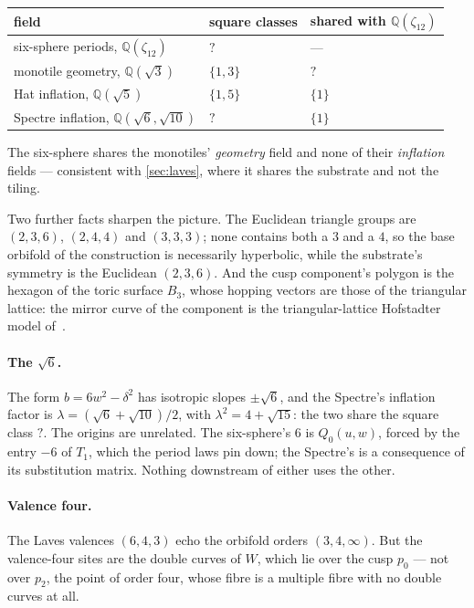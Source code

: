 \documentclass[11pt,a4paper]{article}
\newcommand{\SSClassesPeriods}{?}\newcommand{\SSClassesSpectre}{?}
\newcommand{\SSShareGeometry}{?}\newcommand{\SSShareLatticeSpectre}{?}
\newcommand{\QQ}{\mathbb{Q}}
\theoremstyle{plain}
\theoremstyle{definition}
\begin{document}
\begin{center}
\small
\begin{tabular}{lll}
\toprule
field & square classes & shared with $\QQ(\zeta_{12})$ \\
\midrule
six-sphere periods, $\QQ(\zeta_{12})$ & $\SSClassesPeriods$ & --- \\
monotile geometry, $\QQ(\sqrt3)$ & $\{1, 3\}$ & $\SSShareGeometry$ \\
Hat inflation, $\QQ(\sqrt5)$ & $\{1, 5\}$ & $\{1\}$ \\
Spectre inflation, $\QQ(\sqrt6, \sqrt{10})$ & $\SSClassesSpectre$ & $\{1\}$ \\
\bottomrule
\end{tabular}
\end{center}

The six-sphere shares the monotiles' \emph{geometry} field and none of their
\emph{inflation} fields --- consistent with \cref{sec:laves}, where it shares
the substrate and not the tiling.

Two further facts sharpen the picture. The Euclidean triangle groups are
$(2,3,6)$, $(2,4,4)$ and $(3,3,3)$; none contains both a $3$ and a $4$, so
the base orbifold of the construction is necessarily hyperbolic, while the
substrate's symmetry is the Euclidean $(2,3,6)$. And the cusp component's
polygon is the hexagon of the toric surface $B_3$, whose hopping vectors are
those of the triangular lattice: the mirror curve of the component is the
triangular-lattice Hofstadter model of~\cite{chen2025,shaffer2022}.

\paragraph{The $\sqrt6$.} The form $b = 6w^2 - \delta^2$ has isotropic
slopes $\pm\sqrt6$, and the Spectre's inflation factor is $\lambda =
(\sqrt6 + \sqrt{10})/2$, with $\lambda^2 = 4 + \sqrt{15}$: the two share the
square class $\SSShareLatticeSpectre$. The origins are unrelated. The
six-sphere's $6$ is $Q_0(u,w)$, forced by the entry $-6$ of $T_1$, which the period laws pin down; the Spectre's is a consequence of
its substitution matrix. Nothing downstream of either uses the other.

\paragraph{Valence four.} The Laves valences $(6, 4, 3)$ echo the orbifold
orders $(3, 4, \infty)$. But the valence-four sites are the double curves of
$W$, which lie over the cusp $p_0$ --- not over $p_2$, the point of order
four, whose fibre is a multiple fibre with no double curves at all.
\end{document}
